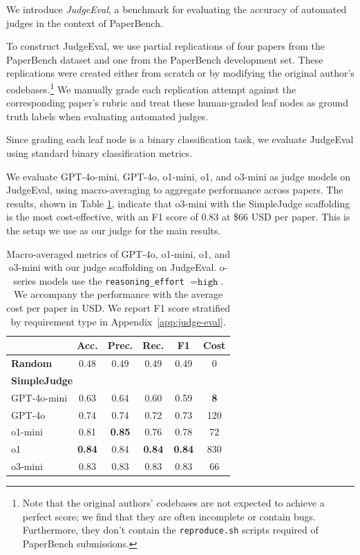 \documentclass{article}
\theoremstyle{plain}
\theoremstyle{definition}
\theoremstyle{remark}
\begin{document}
We introduce \textit{JudgeEval}, a benchmark for evaluating the accuracy of automated judges in the context of PaperBench.

To construct JudgeEval, we use partial replications of four papers from the PaperBench dataset and one from the PaperBench development set. These replications were created either from scratch or by modifying the original author's codebases.\footnote{Note that the original authors' codebases are not expected to achieve a perfect score; we find that they are often incomplete or contain bugs. Furthermore, they don't contain the \texttt{reproduce.sh} scripts required of PaperBench submissions.} We manually grade each replication attempt against the corresponding paper's rubric and treat these human-graded leaf nodes as ground truth labels when evaluating automated judges.

Since grading each leaf node is a binary classification task, we evaluate JudgeEval using standard binary classification metrics.

We evaluate GPT-4o-mini, GPT-4o, o1-mini, o1, and o3-mini as judge models on JudgeEval, using macro-averaging to aggregate performance across papers. The results, shown in Table \ref{tab:judge-metrics}, indicate that o3-mini with the SimpleJudge scaffolding is the most cost-effective, with an F1 score of 0.83 at \$66 USD per paper. This is the setup we use as our judge for the main results.

\begin{table}[tb]
\caption{Macro-averaged metrics of GPT-4o, o1-mini, o1, and o3-mini with our judge scaffolding on JudgeEval. o-series models use the \texttt{reasoning\_effort} $= \texttt{high}$. We accompany the performance with the average cost per paper in USD. We report F1 score stratified by requirement type in Appendix~\ref{app:judge-eval}.}
\label{tab:judge-metrics}
\begin{small}
\begin{sc}
\begin{tabular}{lccccc}
\toprule
 & \textbf{Acc.} & \textbf{Prec.} & \textbf{Rec.} & \textbf{F1} & \textbf{Cost} \\
\midrule
\textbf{Random} & 0.48 & 0.49 & 0.49 & 0.49 & 0 \\
\midrule
\multicolumn{5}{l}{\textbf{SimpleJudge}} \\[1pt]
GPT-4o-mini & 0.63 & 0.64 & 0.60 & 0.59 & \textbf{8} \\
GPT-4o      & 0.74 & 0.74 & 0.72 & 0.73 & 120\\
o1-mini   & 0.81  & \textbf{0.85}  & 0.76  & 0.78 & 72\\
o1        & \textbf{0.84}  & 0.84  & \textbf{0.84}  & \textbf{0.84} & 830 \\
o3-mini        & 0.83  & 0.83  & 0.83 & 0.83 & 66 \\
\bottomrule
\end{tabular}
\end{sc}
\end{small}
\end{table}
\end{document}

